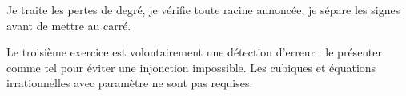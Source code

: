 \begin{jemeteste}Je traite les pertes de degré, je vérifie toute racine annoncée, je sépare les signes avant de mettre au carré.\end{jemeteste}
\begin{notepourlaclasse}Le troisième exercice est volontairement une détection d’erreur : le présenter comme tel pour éviter une injonction impossible. Les cubiques et équations irrationnelles avec paramètre ne sont pas requises.\end{notepourlaclasse}
